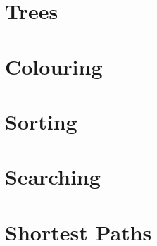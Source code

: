\section{Trees}

\section{Colouring}

\section{Sorting}

\section{Searching}

\section{Shortest Paths}
